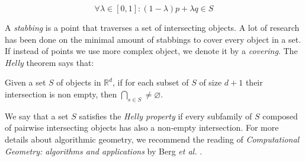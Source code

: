 $$\forall \lambda \in [0,1]: (1-\lambda)p + \lambda q \in S$$

A \emph{stabbing} is a point that traverses a set of intersecting objects. A lot of research has been done \cite{schlipf2013stabbing} on the minimal amount of stabbings to cover every object in a set. If instead of points we use more complex object, we denote it by a \emph{covering}. The \emph{Helly} theorem says that:

\begin{_theo}
  Given a set $S$ of objects in $\mathbb{R}^d$, if for each subset of $S$ of
  size $d+1$ their intersection is non empty, then $\bigcap_{s \in S} \neq
  \varnothing$.
\end{_theo}

We say that a set $S$ satisfies the \emph{Helly property} if every subfamily of $S$ composed of pairwise intersecting objects has also a non-empty intersection. For more details about algorithmic geometry, we recommend the reading of \textit{Computational Geometry: algorithms and applications} by Berg \textit{et al.} \cite{bergComputationalGeometryAlgorithms2008}.
